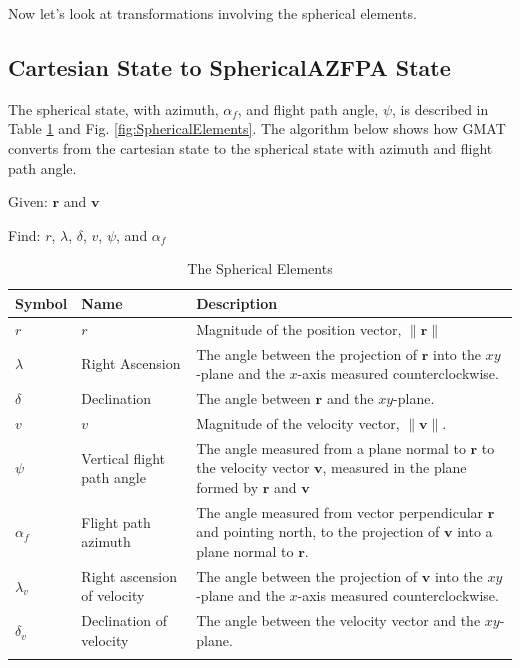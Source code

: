 Now let's look at transformations involving the spherical
elements.

\subsection{Cartesian State to SphericalAZFPA State}
\label{Sec:CarttoSphericalAZFPA}  

The spherical state, with azimuth, $\alpha_f$, and flight path
angle, $\psi$, is described in Table \ref{Table:SphericalElements}
and Fig. \ref{fig:SphericalElements}.  The algorithm below shows
how GMAT converts from the cartesian state to the spherical state
with azimuth and flight path angle.

\noindent Given:  $\mathbf{r}$ and $\mathbf{v}$

\noindent Find:  $r$, $\lambda$, $\delta$, $v$, $\psi$, and
$\alpha_f$

\begin{table} \caption{The Spherical Elements}
\centering {}
\begin{tabular}{p{.5 in} p{1.5 in} p{3.5 in}}
  \hline\hline
   Symbol & Name & Description \\
  \hline
  $r$ & $r$ & Magnitude of the position vector, $\|\mathbf{r}\|$ \\
  $\lambda$ & Right Ascension & The angle between the projection of $\mathbf{r}$ into the $xy$-plane and the $x$-axis measured counterclockwise.   \\
%
  $\delta$ & Declination & The angle between $\mathbf{r}$ and the $xy$-plane. \\

  $v$ & $v$ & Magnitude of the velocity vector, $\|\mathbf{v}\|$. \\
  $\psi$ & Vertical flight path angle & The angle measured from a plane normal to $\mathbf{r}$ to the velocity vector $\mathbf{v}$, measured in the plane formed by $\mathbf{r}$  and $\mathbf{v}$   \\
  $\alpha_f$ & Flight path azimuth & The angle measured from vector perpendicular  $\mathbf{r}$ and pointing north, to the projection of $\mathbf{v}$ into a plane normal to $\mathbf{r}$. \\
    $\lambda_v$ & Right ascension of velocity &  The angle between the projection of $\mathbf{v}$ into the $xy$-plane and the $x$-axis measured counterclockwise. \\
  $\delta_v$ & Declination of velocity &   The angle between the velocity vector and the $xy$-plane. \\
    \hline\hline \label{Table:SphericalElements}
\end{tabular}
\end{table}

